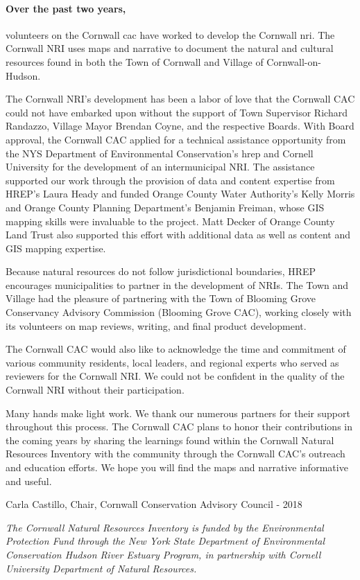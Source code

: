 \paragraph{Over the past two years,} volunteers on the Cornwall \gls{cac} have 
worked to develop the Cornwall \gls{nri}. The Cornwall NRI uses maps and 
narrative to document the natural and cultural resources found in both the Town 
of Cornwall and Village of Cornwall-on-Hudson.
\par
The Cornwall NRI’s development has been a labor of love that the Cornwall CAC 
could not have embarked upon without the support of Town Supervisor Richard 
Randazzo, Village Mayor Brendan Coyne, and the respective Boards. With Board 
approval, the Cornwall CAC applied for a technical assistance opportunity from 
the NYS Department of Environmental Conservation’s \gls{hrep} and Cornell 
University for the development of an intermunicipal NRI. The assistance 
supported our work through the provision of data and content expertise from 
HREP’s Laura Heady and funded Orange County Water Authority’s Kelly Morris and 
Orange County Planning Department's Benjamin Freiman, whose GIS mapping skills 
were invaluable to the project. Matt Decker of Orange County Land Trust also 
supported this effort with additional data as well as content and GIS mapping 
expertise.
\par
Because natural resources do not follow jurisdictional boundaries, HREP 
encourages municipalities to partner in the development of NRIs. The Town and 
Village had the pleasure of partnering with the Town of Blooming Grove 
Conservancy Advisory Commission (Blooming Grove CAC), working closely with its 
volunteers on map reviews, writing, and final product development.
\par
The Cornwall CAC would also like to acknowledge the time and commitment of 
various community residents, local leaders, and regional experts who served as 
reviewers for the Cornwall NRI. We could not be confident in the quality of 
the Cornwall NRI without their participation.
\par
Many hands make light work. We thank our numerous partners for their support 
throughout this process. The Cornwall CAC plans to honor their contributions 
in the coming years by sharing the learnings found within the Cornwall Natural 
Resources Inventory with the community through the Cornwall CAC’s outreach and 
education efforts. We hope you will find the maps and narrative informative 
and useful.
\par
\hfill Carla Castillo, Chair, Cornwall Conservation Advisory Council - 2018
\par
\textit{The Cornwall Natural Resources Inventory is funded by the Environmental 
Protection Fund through the New York State Department of Environmental 
Conservation Hudson River Estuary Program, in partnership with Cornell University Department of Natural Resources.}

